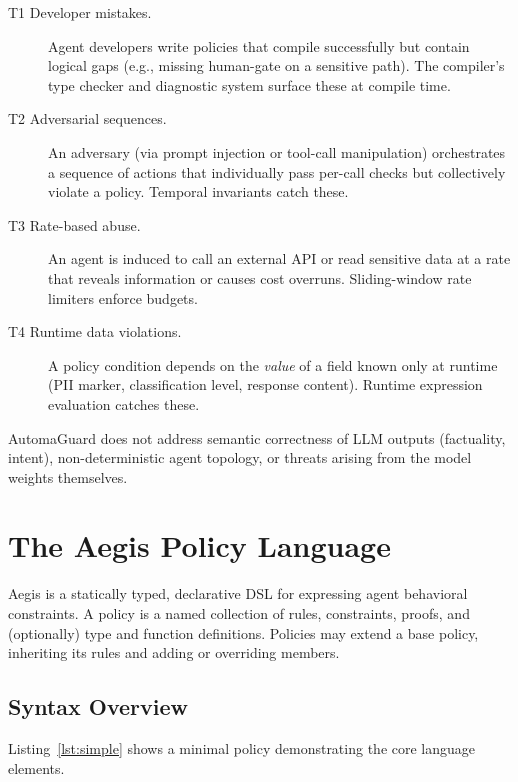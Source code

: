 \documentclass[sigconf]{acmart}
\begin{document}
\begin{description}
  \item[T1 Developer mistakes.] Agent developers write policies that compile
    successfully but contain logical gaps (e.g., missing human-gate on a
    sensitive path). The compiler's type checker and diagnostic system surface
    these at compile time.
  \item[T2 Adversarial sequences.] An adversary (via prompt injection or
    tool-call manipulation) orchestrates a sequence of actions that individually
    pass per-call checks but collectively violate a policy. Temporal invariants
    catch these.
  \item[T3 Rate-based abuse.] An agent is induced to call an external API or
    read sensitive data at a rate that reveals information or causes cost
    overruns. Sliding-window rate limiters enforce budgets.
  \item[T4 Runtime data violations.] A policy condition depends on the
    \emph{value} of a field known only at runtime (PII marker, classification
    level, response content). Runtime expression evaluation catches these.
\end{description}

\noindent AutomaGuard does not address semantic correctness of LLM outputs
(factuality, intent), non-deterministic agent topology, or threats arising from
the model weights themselves.


\section{The Aegis Policy Language}
\label{sec:aegis}

Aegis is a statically typed, declarative DSL for expressing agent behavioral
constraints. A policy is a named collection of rules, constraints, proofs, and
(optionally) type and function definitions. Policies may extend a base policy,
inheriting its rules and adding or overriding members.

\subsection{Syntax Overview}

Listing~\ref{lst:simple} shows a minimal policy demonstrating the core
language elements.
\end{document}

